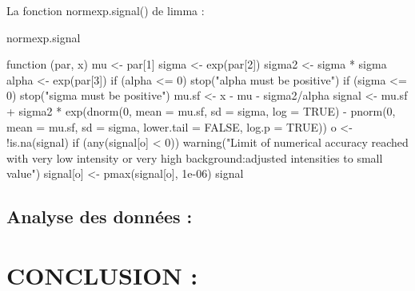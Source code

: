 \documentclass[a4paper,10pt]{article}
\begin{document}
\begin{Schunk}
La fonction normexp.signal() de limma :
\begin{Sinput}
 normexp.signal
\end{Sinput}
\begin{Soutput}
function (par, x) 
{
    mu <- par[1]
    sigma <- exp(par[2])
    sigma2 <- sigma * sigma
    alpha <- exp(par[3])
    if (alpha <= 0) 
        stop("alpha must be positive")
    if (sigma <= 0) 
        stop("sigma must be positive")
    mu.sf <- x - mu - sigma2/alpha
    signal <- mu.sf + sigma2 * exp(dnorm(0, mean = mu.sf, sd = sigma, 
        log = TRUE) - pnorm(0, mean = mu.sf, sd = sigma, lower.tail = FALSE, 
        log.p = TRUE))
    o <- !is.na(signal)
    if (any(signal[o] < 0)) {
        warning("Limit of numerical accuracy reached with very low intensity 
        or very high background:\nsetting adjusted intensities to small value")
        signal[o] <- pmax(signal[o], 1e-06)
    }
    signal
}
\end{Soutput}
\end{Schunk}
\subsection{Analyse des données :}
\section{CONCLUSION :}
\nocite{smyth2005limma}
\nocite{druaghici2016statistics}
 

\end{document}
